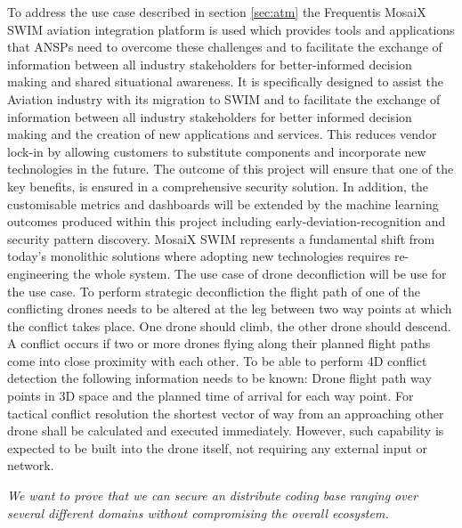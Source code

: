 \begin{Workpackage}{\thewpno}
\begin{Task}
To address the use case described in section \ref{sec:atm} the Frequentis MosaiX SWIM aviation integration platform is used which provides tools and applications that ANSPs need to overcome these challenges and to facilitate the exchange of information between all industry stakeholders for better-informed decision making and shared situational awareness. It is specifically designed to assist the Aviation industry with its migration to SWIM and to facilitate the exchange of information between all industry stakeholders for better informed decision making and the creation of new applications and services. This reduces vendor lock-in by allowing customers to substitute components and incorporate new technologies in the future. The outcome of this project will ensure that one of the key benefits, is ensured in a comprehensive security solution.
In addition, the customisable metrics and dashboards will be extended by the machine learning outcomes produced within this project including early-deviation-recognition and security pattern discovery. MosaiX SWIM represents a fundamental shift from today’s monolithic solutions where adopting new technologies requires re-engineering the whole system.
The use case of drone deconfliction will be use for the use case. To perform strategic deconfliction the flight path of one of the conflicting drones needs to be altered at the leg between two way points at which the conflict takes place. One drone should climb, the other drone should descend. A conflict occurs if two or more drones flying along their planned flight paths come into close proximity with each other. To be able to perform 4D conflict detection the following information needs to be known: Drone flight path way points in 3D space and the planned time of arrival for each way point. For tactical conflict resolution the shortest vector of way from an approaching other drone shall be calculated and executed immediately. However, such capability is expected to be built into the drone itself, not requiring any external input or network.

\emph{We want to prove that we can secure an distribute coding base ranging over several different domains without compromising the overall ecosystem.}



\end{Task}
\end{Workpackage}
